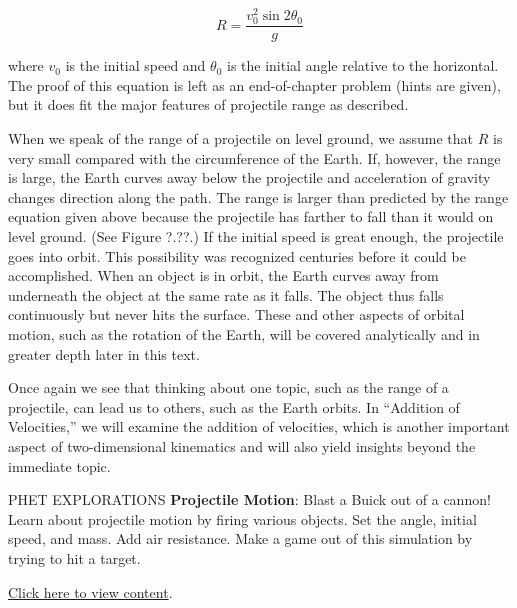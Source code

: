 \documentclass[../../main-ap-physics.tex]{subfiles}
\begin{document}
\begin{equation}
    R = \frac{v_0^2 \sin{2 \theta_0}}{g}
\end{equation}

where $v_0$ is the initial speed and $\theta_0$ is the initial angle relative to the horizontal. The proof of this equation is left as an end-of-chapter problem (hints are given), but it does fit the major features of projectile range as described.

\vspace{1em}

When we speak of the range of a projectile on level ground, we assume that $R$ is very small compared with the circumference of the Earth. If, however, the range is large, the Earth curves away below the projectile and acceleration of gravity changes direction along the path. The range is larger than predicted by the range equation given above because the projectile has farther to fall than it would on level ground. (See Figure ?.??.) If the initial speed is great enough, the projectile goes into orbit. This possibility was recognized centuries before it could be accomplished. When an object is in orbit, the Earth curves away from underneath the object at the same rate as it falls. The object thus falls continuously but never hits the surface. These and other aspects of orbital motion, such as the rotation of the Earth, will be covered analytically and in greater depth later in this text.

\vspace{1em}

Once again we see that thinking about one topic, such as the range of a projectile, can lead us to others, such as the Earth orbits. In ``Addition of Velocities,'' we will examine the addition of velocities, which is another important aspect of two-dimensional kinematics and will also yield insights beyond the immediate topic.

\begin{gradient}{PHET EXPLORATIONS}
    \textbf{Projectile Motion}: Blast a Buick out of a cannon! Learn about projectile motion by firing various objects. Set the angle, initial speed, and mass. Add air resistance. Make a game out of this simulation by trying to hit a target.   

    \vspace{1em}

    \href{https://phet.colorado.edu/sims/html/projectile-motion/latest/projectile-motion_all.html}{Click here to view content}.
\end{gradient}
\end{document}
